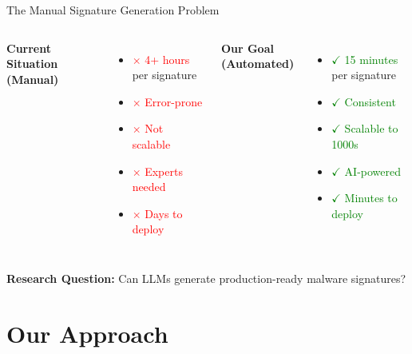\documentclass[11pt,aspectratio=16:9]{beamer}
\begin{document}
\begin{frame}{The Manual Signature Generation Problem}
  \vspace{0.5cm}
  \begin{columns}[T]
    \textbf{\textcolor{accent1}{Current Situation (Manual)}}
    \begin{itemize}
      \item \textcolor{red}{$\times$ 4+ hours} per signature
      \item \textcolor{red}{$\times$ Error-prone}
      \item \textcolor{red}{$\times$ Not scalable}
      \item \textcolor{red}{$\times$ Experts needed}
      \item \textcolor{red}{$\times$ Days to deploy}
    \end{itemize}
    
    \textbf{\textcolor{accent2}{Our Goal (Automated)}}
    \begin{itemize}
      \item \textcolor{green}{$\checkmark$ 15 minutes} per signature
      \item \textcolor{green}{$\checkmark$ Consistent}
      \item \textcolor{green}{$\checkmark$ Scalable to 1000s}
      \item \textcolor{green}{$\checkmark$ AI-powered}
      \item \textcolor{green}{$\checkmark$ Minutes to deploy}
    \end{itemize}
  \end{columns}
  
  \vspace{1cm}
  \begin{tcolorbox}[colback=lightgray, colframe=darkblue, boxrule=2pt]
    \centering \large
    \textbf{Research Question:} Can LLMs generate production-ready malware signatures?
  \end{tcolorbox}
\end{frame}

\section{Our Approach}
\end{document}
